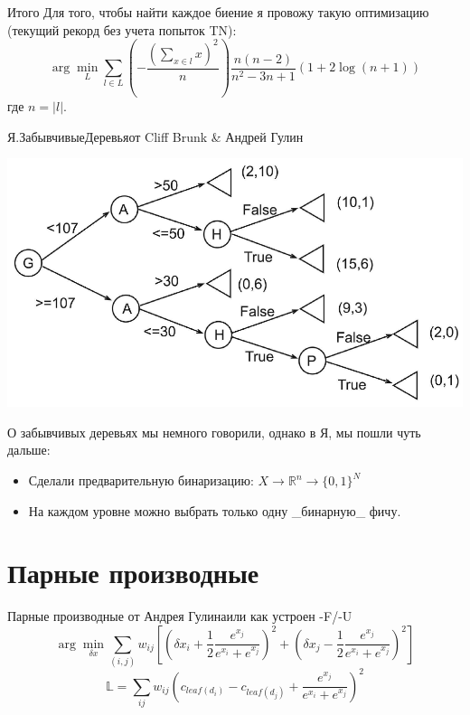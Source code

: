 \documentclass[14pt, fleqn, xcolor={dvipsnames, table}]{beamer}
\begin{document}
\begin{frame}{Итого}
Для того, чтобы найти каждое биение я провожу такую оптимизацию (текущий рекорд без учета попыток TN):
$$
\arg \min_{L} \sum_{l \in L} \left(- \frac{\left(\sum_{x \in l}x\right)^2}{n}\right)\frac{n (n - 2)}{n^2 - 3n +1} \left(1 + 2 \log(n + 1)\right)
$$
где $n = |l|$.
\end{frame}

\begin{frame}{Я.ЗабывчивыеДеревья}{от Cliff Brunk \& Андрей Гулин}
\begin{center}
\includegraphics[height=0.3\textheight]{ObliviousTree.png} 
\end{center}
О забывчивых деревьях мы немного говорили, однако в Я, мы пошли чуть дальше:
\begin{itemize}
  \item Сделали предварительную бинаризацию: $X \to \mathbb{R}^n \to \{0, 1\}^N$
  \item На каждом уровне можно выбрать только одну \_бинарную\_ фичу.
\end{itemize} 
\end{frame}

\section{Парные производные}

\begin{frame}{Парные производные от Андрея Гулина}{или как устроен -F/-U}
$$
\arg \min_{\delta x} \sum_{(i,j)} w_{ij} \left[ \left( \delta x_i + \frac{1}{2} \frac{e^{x_j}}{e^{x_i} + e^{x_j}} \right)^2 + \left( \delta x_j - \frac{1}{2} \frac{e^{x_j}}{e^{x_i} + e^{x_j}} \right)^2 \right]
$$
$$
\mathbb{L} = \sum_{ij} w_{ij} \left(c_{leaf(d_i)} - c_{leaf(d_j)} + \frac{e^{x_j}}{e^{x_i}+e^{x_j}}\right)^2
$$

\end{frame}
\end{document}
